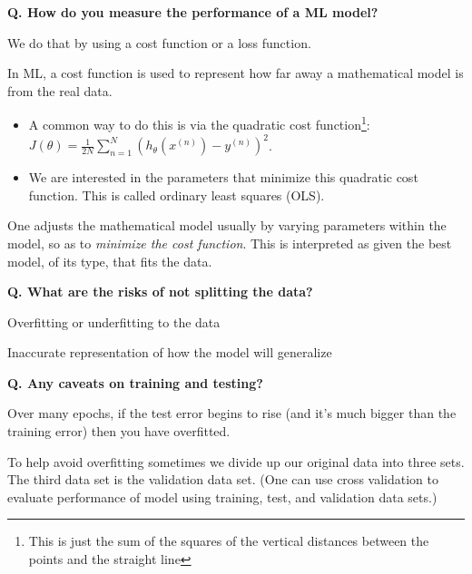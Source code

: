 \begin{frame}[fragile]{\textbf{Q. How do you measure the performance of a ML model?}}
  \begin{wideitemize}
    \item We do that by using a cost function or a loss function.
    \item In ML, a cost function is used to represent how far away a mathematical
    model is from the real data.
    \begin{itemize}
      \item A common way to do this is via the quadratic cost function\footnote{This is
      just the sum of the squares of the vertical distances between the points and the straight line}:\vspace{.4em}
      $J(\theta) = \frac{1}{2N}\sum^{N}_{n=1}(h_{\theta}(x^{(n)}) - y^{(n)})^{2}$.\vspace{.4em}
      \item We are interested in the parameters that minimize this quadratic cost function.
      This is called ordinary least squares (OLS).
    \end{itemize}
    \item One adjusts the mathematical model usually by varying parameters within the model, so as
    to \textit{minimize the cost function}. This is interpreted as given the best model, of
    its type, that fits the data.
  \end{wideitemize}
\end{frame}

\begin{frame}[fragile]{\textbf{Q. What are the risks of not splitting the data?}}
  \begin{wideitemize}
    \item Overfitting or underfitting to the data
    \item Inaccurate representation of how the model will generalize
  \end{wideitemize}
\end{frame}

\begin{frame}[fragile]{\textbf{Q. Any caveats on training and testing?}}
  \begin{wideitemize}
    \item Over many epochs, if the test error begins to rise (and it's much
    bigger than the training error) then you have overfitted.
    \item To help avoid overfitting sometimes we divide up our original data
    into three sets. The third data set is the validation data set.
    (One can use cross validation to evaluate performance of model using
    training, test, and validation data sets.)
  \end{wideitemize}
\end{frame}


